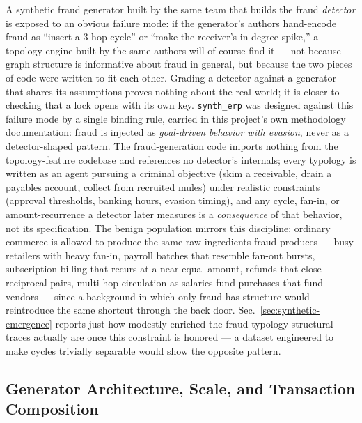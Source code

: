 A synthetic fraud generator built by the same team that builds the fraud
\emph{detector} is exposed to an obvious failure mode: if the generator's
authors hand-encode fraud as ``insert a 3-hop cycle'' or ``make the receiver's
in-degree spike,'' a topology engine built by the same authors will of course
find it — not because graph structure is informative about fraud in general,
but because the two pieces of code were written to fit each other. Grading a
detector against a generator that shares its assumptions proves nothing about
the real world; it is closer to checking that a lock opens with its own key.
\texttt{synth\_erp} was designed against this failure mode by a single binding
rule, carried in this project's own methodology documentation: fraud is
injected as \emph{goal-driven behavior with evasion}, never as a
detector-shaped pattern. The fraud-generation code imports nothing from the
topology-feature codebase and references no detector's internals; every
typology is written as an agent pursuing a criminal objective (skim a
receivable, drain a payables account, collect from recruited mules) under
realistic constraints (approval thresholds, banking hours, evasion timing),
and any cycle, fan-in, or amount-recurrence a detector later measures is a
\emph{consequence} of that behavior, not its specification. The benign
population mirrors this discipline: ordinary commerce is allowed to produce
the same raw ingredients fraud produces — busy retailers with heavy fan-in,
payroll batches that resemble fan-out bursts, subscription billing that
recurs at a near-equal amount, refunds that close reciprocal pairs, multi-hop
circulation as salaries fund purchases that fund vendors — since a background
in which only fraud has structure would reintroduce the same shortcut through
the back door. Sec.~\ref{sec:synthetic-emergence} reports just how modestly
enriched the fraud-typology structural traces actually are once this
constraint is honored — a dataset engineered to make cycles trivially
separable would show the opposite pattern.

\subsection{Generator Architecture, Scale, and Transaction Composition}

